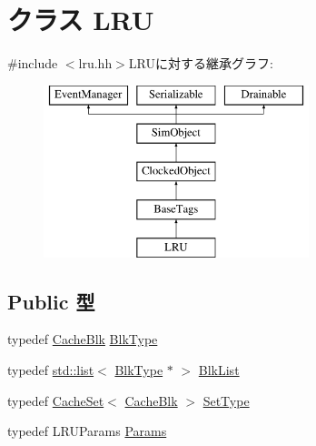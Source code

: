 \hypertarget{classLRU}{
\section{クラス LRU}
\label{classLRU}
}


{\ttfamily \#include $<$lru.hh$>$}LRUに対する継承グラフ:\begin{figure}[H]
\begin{center}
\leavevmode
\includegraphics[height=5cm]{classLRU}
\end{center}
\end{figure}
\subsection*{Public 型}
\begin{DoxyCompactItemize}
\item 
typedef \hyperlink{classCacheBlk}{CacheBlk} \hyperlink{classLRU_a005ef3750319995a4a77bcfeee56e222}{BlkType}
\item 
typedef \hyperlink{classstd_1_1list}{std::list}$<$ \hyperlink{classCacheBlk}{BlkType} $\ast$ $>$ \hyperlink{classLRU_a10e9d0cbb622eb6efe1dd332af622902}{BlkList}
\item 
typedef \hyperlink{classCacheSet}{CacheSet}$<$ \hyperlink{classCacheBlk}{CacheBlk} $>$ \hyperlink{classLRU_a3c0e5e439e276493def31913011594ff}{SetType}
\item 
typedef LRUParams \hyperlink{classLRU_a7817e729934956b9b3573d13924bf1eb}{Params}
\end{DoxyCompactItemize}
